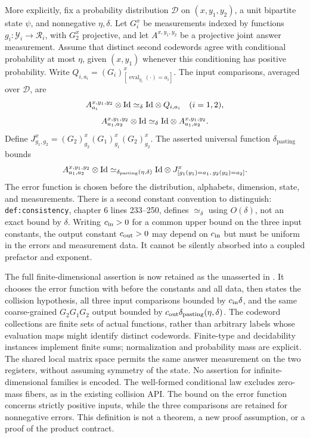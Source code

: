 \documentclass[11pt]{article}
\begin{document}
More explicitly, fix a probability distribution $\mathcal D$ on
$(x,y_1,y_2)$, a unit bipartite state $\psi$, and nonnegative $\eta,\delta$.
Let $G_i^x$ be measurements indexed by functions
$g_i:\mathcal Y_i\to\mathcal R_i$, with $G_2^x$ projective, and let
$A^{x,y_1,y_2}$ be a projective joint answer measurement. Assume that distinct
second codewords agree with conditional probability at most $\eta$, given
$(x,y_1)$ whenever this conditioning has positive probability. Write
$Q_{i,a_i}=(G_i)^x_{[\operatorname{eval}_{y_i}(\cdot)=a_i]}$.
The input comparisons, averaged over $\mathcal D$, are
\begin{equation}\label{eq:pasting-1}
 A^{x,y_1,y_2}_{a_i}\otimes\mathrm{Id}
 \simeq_\delta\mathrm{Id}\otimes Q_{i,a_i}\quad(i=1,2),
\end{equation}
\begin{equation}\label{eq:pasting-2}
 A^{x,y_1,y_2}_{a_1,a_2}\otimes\mathrm{Id}
 \simeq_\delta\mathrm{Id}\otimes A^{x,y_1,y_2}_{a_1,a_2}.
\end{equation}
Define $J^x_{g_1,g_2}=(G_2)^x_{g_2}(G_1)^x_{g_1}(G_2)^x_{g_2}$.
The asserted universal function $\delta_{\mathrm{pasting}}$ bounds
\begin{equation}\label{eq:pasting-3}
 A^{x,y_1,y_2}_{a_1,a_2}\otimes\mathrm{Id}
 \simeq_{\delta_{\mathrm{pasting}}(\eta,\delta)}
 \mathrm{Id}\otimes J^x_{[g_1(y_1)=a_1,\,g_2(y_2)=a_2]}.
\end{equation}
The error function is chosen before the distribution, alphabets, dimension,
state, and measurements. There is a second constant convention to distinguish:
\texttt{def:consistency}, chapter 6 lines 233--250, defines
$\simeq_\delta$ using $O(\delta)$, not an exact bound by $\delta$.
Writing $c_{\rm in}>0$ for a common upper bound on the three input
constants, the output constant $c_{\rm out}>0$ may depend on
$c_{\rm in}$ but must be uniform in the errors and measurement data.
It cannot be silently absorbed into a coupled prefactor and exponent.

The full finite-dimensional assertion is now retained as the unasserted
 in
. It chooses the error function
with  before the constants and all data,
then states the collision hypothesis, all three input comparisons bounded
by $c_{\rm in}\delta$, and the same coarse-grained $G_2G_1G_2$ output
bounded by $c_{\rm out}\delta_{\rm pasting}(\eta,\delta)$.
The codeword collections are finite sets of actual functions, rather than
arbitrary labels whose evaluation maps might identify distinct codewords.
Finite-type and decidability instances implement finite sums; normalization
and probability mass are explicit. The shared local matrix space permits
the same answer measurement on the two registers, without assuming symmetry
of the state. No assertion for infinite-dimensional families is encoded.
The well-formed conditional law excludes zero-mass fibers, as in the
existing collision API. The bound on the error function concerns strictly
positive inputs, while the three comparisons are retained for nonnegative
errors. This definition is not a theorem, a new proof assumption, or a
proof of the product contract.
\end{document}
